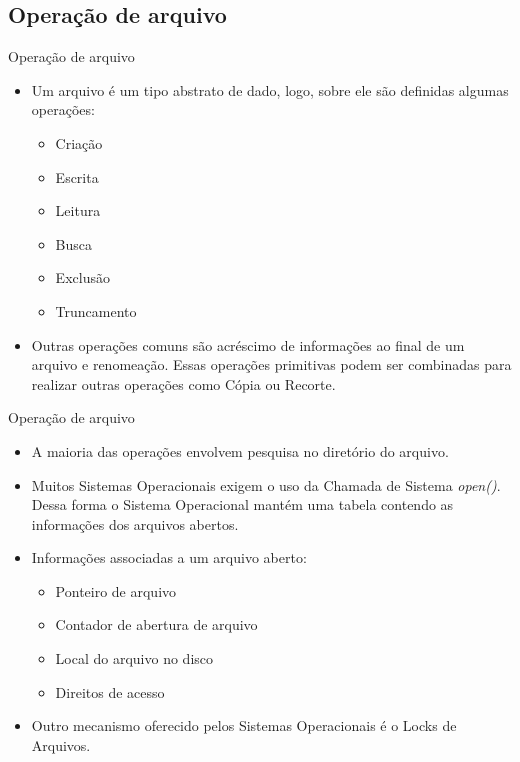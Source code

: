 \documentclass[10pt,brazil]{beamer}
\begin{document}
\subsection{Operação de arquivo}
\begin{frame}{Operação de arquivo}    
	\begin{itemize}
	\item Um arquivo é um tipo abstrato de dado, logo, sobre ele são definidas algumas operações:
	\begin{itemize}
		\item Criação
		\item Escrita
		\item Leitura
		\item Busca
		\item Exclusão
		\item Truncamento
	\end{itemize}
	\item Outras operações comuns são acréscimo de informações ao final de um arquivo e renomeação. Essas operações primitivas podem ser combinadas para realizar outras operações como Cópia ou Recorte.
	\end{itemize}
	
	\end{frame}
      
\begin{frame}{Operação de arquivo}
	\begin{itemize}
	
	\item A maioria das operações envolvem pesquisa no diretório do arquivo.
	\item Muitos Sistemas Operacionais exigem o uso da Chamada de Sistema \emph{open()}. Dessa forma o Sistema Operacional mantém uma tabela contendo as informações dos arquivos abertos.
	\item Informações associadas a um arquivo aberto:
	\begin{itemize}
		\item Ponteiro de arquivo
		\item Contador de abertura de arquivo
		\item Local do arquivo no disco
		\item Direitos de acesso
	\end{itemize}
	\item Outro mecanismo oferecido pelos Sistemas Operacionais é o Locks de Arquivos.
	\end{itemize}  

\end{frame} 
\end{document}
